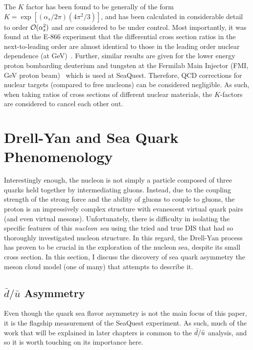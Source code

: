 The $K$ factor has been found to be generally of the form $K = \exp[(\alpha_s/2\pi)(4\pi^2/3)]$, and has been calculated in considerable detail~\cite{Matsuura:1988sm} to order $\mathcal{O}(\alpha_s^2)$ and are considered to be under control. Most importantly, it was found at the E-866 experiment that the differential cross section ratios in the next-to-leading order are almost identical to those in the leading order nuclear dependence (at \unit[800]{GeV})~\cite{Duan:2004cw}. Further, similar results are given for the lower energy proton bombarding deuterium and tungsten at the Fermilab Main Injector (FMI, \unit[120]{GeV} proton beam)~\cite{Geesaman:906prop} which is used at SeaQuest. Therefore, QCD corrections for nuclear targets (compared to free nucleons) can be considered negligible. As such, when taking ratios of cross sections of different nuclear materials, the $K$-factors are considered to cancel each other out.

\section{Drell-Yan and Sea Quark Phenomenology}

Interestingly enough, the nucleon is not simply a particle composed of three quarks held together by intermediating gluons. Instead, due to the coupling strength of the strong force and the ability of gluons to couple to gluons, the proton is an impressively complex structure with evanescent virtual quark pairs (and even virtual mesons). Unfortunately, there is difficulty in isolating the specific features of this \emph{nucleon sea} using the tried and true DIS that had so thoroughly investigated nucleon structure. In this regard, the Drell-Yan process has proven to be crucial in the exploration of the nucleon sea, despite its small cross section. In this section, I discuss the discovery of sea quark asymmetry the meson cloud model (one of many) that attempts to describe it.

\subsection{$\bar{d}/\bar{u}$ Asymmetry}\label{sec:dbar-ubar}

Even though the quark sea flavor asymmetry is not the main focus of this paper, it is the flagship measurement of the SeaQuest experiment. As such, much of the work that will be explained in later chapters is common to the $\bar{d}/\bar{u}$ analysis, and so it is worth touching on its importance here.

